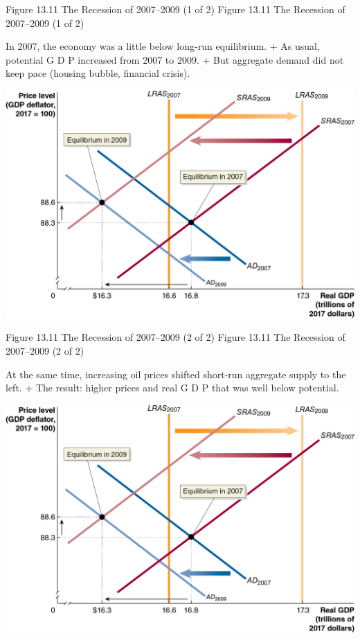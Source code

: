\documentclass[
  12pt,
  ignorenonframetext,
]{beamer}
\begin{document}
\begin{frame}{Figure 13.11 The Recession of 2007--2009 (1 of 2)}
\protect\hypertarget{figure-13.11-the-recession-of-20072009-1-of-2}{}
Figure 13.11 The Recession of 2007--2009 (1 of 2)

In 2007, the economy was a little below long-run equilibrium. + As
usual, potential G D P increased from 2007 to 2009. + But aggregate
demand did not keep pace (housing bubble, financial crisis).

\includegraphics[width=\textwidth,height=0.99\textheight]{imgs3/img_slide48a.png}
\end{frame}

\begin{frame}{Figure 13.11 The Recession of 2007--2009 (2 of 2)}
\protect\hypertarget{figure-13.11-the-recession-of-20072009-2-of-2}{}
Figure 13.11 The Recession of 2007--2009 (2 of 2)

At the same time, increasing oil prices shifted short-run aggregate
supply to the left. + The result: higher prices and real G D P that was
well below potential.

\includegraphics[width=\textwidth,height=0.99\textheight]{imgs3/img_slide49a.png}
\end{frame}
\end{document}
